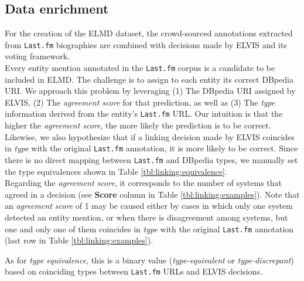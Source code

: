 


\subsection{Data enrichment}
\label{sec:linking:enrichment}

For the creation of the ELMD dataset, the crowd-sourced annotations extracted from \texttt{Last.fm} biographies are combined with decisions made by \textsc{ELVIS} and its voting framework.\\%

Every entity mention annotated in the \texttt{Last.fm} corpus is a candidate to be included in \textsc{ELMD}. The challenge is to assign to each entity its correct DBpedia URI. We approach this problem by leveraging (1) The DBpedia URI assigned by \textsc{ELVIS}, (2) The \textit{agreement score} for that prediction, as well as (3) The \textit{type} information derived from the entity's \texttt{Last.fm} URL. Our intuition is that the higher the \textit{agreement score}, the more likely the prediction is to be correct. Likewise, we also hypothesize that if a linking decision made by \textsc{ELVIS} coincides in \textit{type} with the original \texttt{Last.fm} annotation, it is more likely to be correct. Since there is no direct mapping between \texttt{Last.fm} and DBpedia types, we manually set the type equivalences shown in Table \ref{tbl:linking:equivalence}.\\

Regarding the \textit{agreement score}, it corresponds to the number of systems that agreed in a decision (see \textbf{Score} column in Table \ref{tbl:linking:examples}). Note that an \textit{agreement score} of 1 may be caused either by cases in which only one system detected an entity mention, or when there is disagreement among systems, but one and only one of them coincides in \textit{type} with the original \texttt{Last.fm} annotation (last row in Table \ref{tbl:linking:examples}).

As for \textit{type equivalence}, this is a binary value (\textit{type-equivalent} or \textit{type-discrepant}) based on coinciding types between \texttt{Last.fm} URLs and \textsc{ELVIS} decisions.

